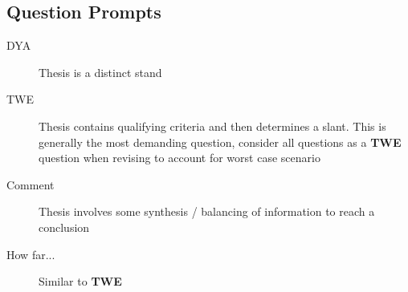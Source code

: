 \documentclass[../../main]{subfiles}
\begin{document}
\subsection{Question Prompts}

\begin{description}
	\item[DYA] Thesis is a distinct stand
	\item[TWE] Thesis contains qualifying criteria and then determines a slant. This is generally the most demanding question, consider all questions as a \textbf{TWE} question when revising to account for worst case scenario
	\item[Comment] Thesis involves some synthesis / balancing of information to reach a conclusion
	\item[How far...] Similar to \textbf{TWE}
\end{description}
\end{document}
